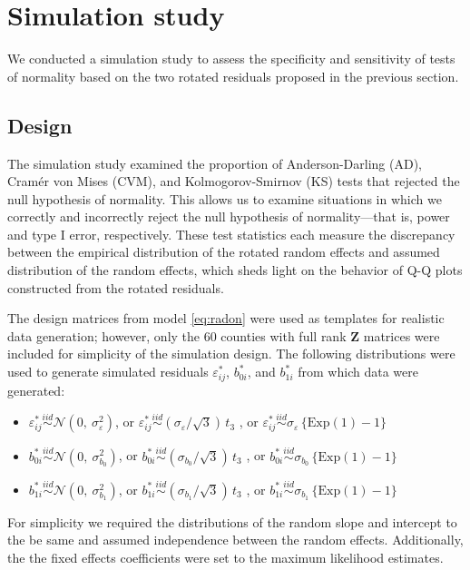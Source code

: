 \documentclass[12pt]{article} %
\begin{document}
\section{Simulation study}\label{sec:simulation}

We conducted a simulation study to assess the specificity and sensitivity of tests of normality based on the two rotated residuals proposed in the previous section. 

\subsection{Design}\label{sec:sim-design}

The simulation study examined the proportion of Anderson-Darling (AD), Cram{\'e}r von Mises (CVM), and Kolmogorov-Smirnov (KS) tests that rejected the null hypothesis of normality. This allows us to examine situations in which we correctly and incorrectly reject the null hypothesis of normality---that is, power and type I error, respectively.  These test statistics each measure the discrepancy between the empirical distribution of the rotated random effects and assumed distribution of the random effects, which sheds light on the behavior of Q-Q plots constructed from the rotated residuals. 

The design matrices from model \eqref{eq:radon} were used as templates for realistic data generation; however, only the 60 counties with full rank $\bm{Z}$ matrices were included for simplicity of the simulation design.
The following distributions were used to generate simulated residuals $\varepsilon_{ij}^*$, $b_{0i}^*$, and $b_{1i}^*$ from which data were generated:
%
\begin{itemize}
\item $\varepsilon_{ij}^* \overset{iid}{\sim} \mathcal{N}(0, \ \sigma^2_{\varepsilon})$, or $\varepsilon_{ij}^* \overset{iid}{\sim} (\sigma_{\varepsilon} / \sqrt{3})\, t_3$ , or $\varepsilon_{ij}^* \overset{iid}{\sim} \sigma_{\varepsilon} \, \{ \text{Exp}(1) - 1 \}$

\item $b_{0i}^* \overset{iid}{\sim} \mathcal{N}(0, \ \sigma^2_{b_{0}})$, or $b_{0i}^* \overset{iid}{\sim} (\sigma_{b_{0}} / \sqrt{3})\, t_3$ , or $b_{0i}^* \overset{iid}{\sim} \sigma_{b_{0}} \, \{ \text{Exp}(1) - 1 \}$

\item $b_{1i}^* \overset{iid}{\sim} \mathcal{N}(0, \ \sigma^2_{b_{1}})$, or $b_{1i}^* \overset{iid}{\sim} (\sigma_{b_{1}} / \sqrt{3})\, t_3$ , or $b_{1i}^* \overset{iid}{\sim} \sigma_{b_{1}} \, \{ \text{Exp}(1) - 1 \}$
\end{itemize}
%
For simplicity we required the distributions of the random slope and intercept to the be same and assumed independence between the random effects. Additionally, the the fixed effects coefficients were set to the maximum likelihood estimates.
\end{document}
